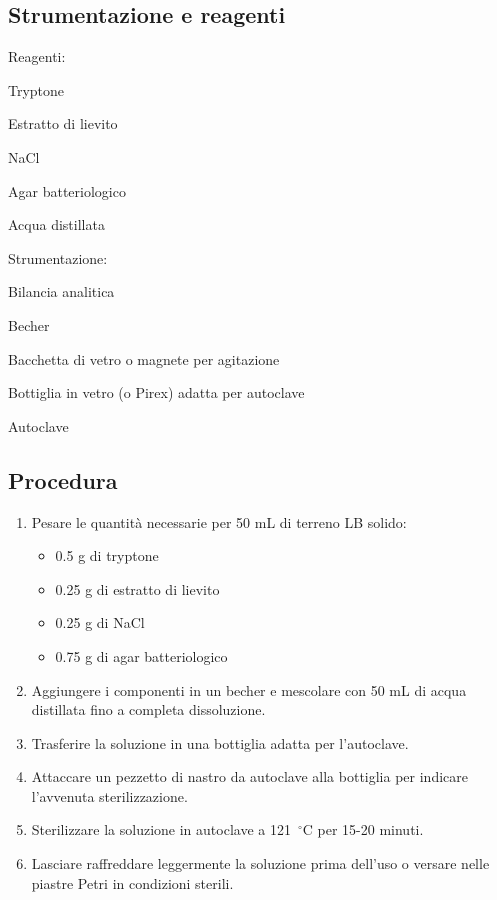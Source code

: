\subsection{Strumentazione e reagenti}

\twoColumnLayout
    {Reagenti:}
    {
    \item Tryptone
    \item Estratto di lievito
    \item NaCl
    \item Agar batteriologico
    \item Acqua distillata
    }
  {Strumentazione:}
  {
    \item Bilancia analitica
    \item Becher
    \item Bacchetta di vetro o magnete per agitazione
    \item Bottiglia in vetro (o Pirex) adatta per autoclave
    \item Autoclave
  }

\subsection{Procedura}

\begin{enumerate}
        \item Pesare le quantità necessarie per 50 mL di terreno LB solido:
    \begin{itemize}
        \item 0.5 g di tryptone
        \item 0.25 g di estratto di lievito
        \item 0.25 g di NaCl
        \item 0.75 g di agar batteriologico
    \end{itemize}
    \item Aggiungere i componenti in un becher e mescolare con 50 mL di acqua distillata fino a completa dissoluzione.
    \item Trasferire la soluzione in una bottiglia adatta per l’autoclave.
    \item Attaccare un pezzetto di nastro da autoclave alla bottiglia per indicare l’avvenuta sterilizzazione.
    \item Sterilizzare la soluzione in autoclave a 121~$^\circ$C per 15-20 minuti.
    \item Lasciare raffreddare leggermente la soluzione prima dell’uso o versare nelle piastre Petri in condizioni sterili.
    
\end{enumerate}